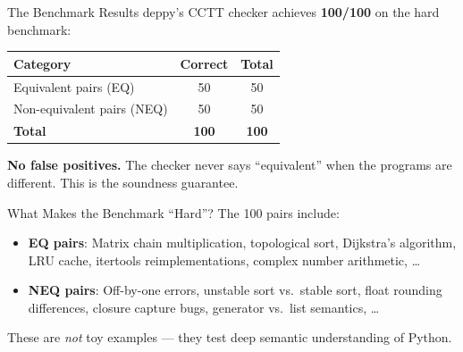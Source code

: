 \documentclass[aspectratio=169,11pt]{beamer}
\begin{document}
\begin{frame}{The Benchmark Results}
deppy's CCTT checker achieves \textbf{100/100} on the hard benchmark:

\begin{center}
\begin{tabular}{lcc}
\toprule
\textbf{Category} & \textbf{Correct} & \textbf{Total} \\
\midrule
Equivalent pairs (EQ) & 50 & 50 \\
Non-equivalent pairs (NEQ) & 50 & 50 \\
\midrule
\textbf{Total} & \textbf{100} & \textbf{100} \\
\bottomrule
\end{tabular}
\end{center}

\vspace{0.5em}
\textbf{No false positives.} The checker never says ``equivalent''
when the programs are different. This is the soundness guarantee.
\end{frame}

\begin{frame}{What Makes the Benchmark ``Hard''?}
The 100 pairs include:
\begin{itemize}
\item \textbf{EQ pairs}: Matrix chain multiplication, topological sort,
  Dijkstra's algorithm, LRU cache, itertools reimplementations,
  complex number arithmetic, \ldots
\item \textbf{NEQ pairs}: Off-by-one errors, unstable sort vs.\ stable sort,
  float rounding differences, closure capture bugs, generator vs.\
  list semantics, \ldots
\end{itemize}

\vspace{0.5em}
These are \emph{not} toy examples --- they test deep semantic understanding
of Python.
\end{frame}
\end{document}
